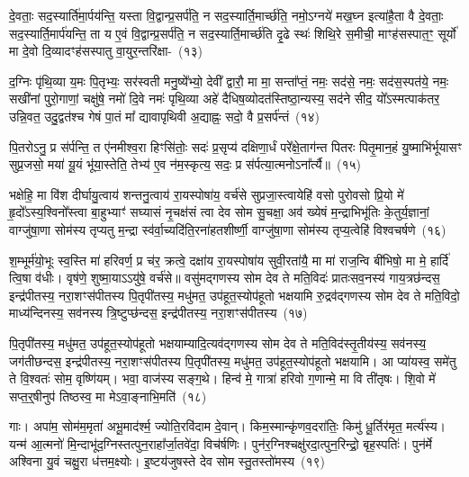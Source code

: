 दे॒वताः॒ सद॒स्यार्ति॑मा॒र्पय॑न्ति॒ यस्ता वि॒द्वान्प्र॒सर्प॑ति॒ न सद॒स्यार्ति॒मार्च्छ॑ति॒ नमो॒\-ऽग्नये॑ मख॒घ्न इत्या॑है॒ता वै दे॒वताः॒ सद॒स्यार्ति॒मार्प॑यन्ति॒ ता य ए॒वं वि॒द्वान्प्र॒सर्प॑ति॒ न सद॒स्यार्ति॒मार्च्छ॑ति दृ॒ढे स्थः॑ शिथि॒रे स॒मीची॒ माꣳह॑सस्पात॒ꣳ॒ सूर्यो॑ मा दे॒वो दि॒व्यादꣳह॑सस्पातु वा॒युर॒न्तरि॑क्षा-~(१३)

द॒ग्निः पृ॑थि॒व्या य॒मः पि॒तृभ्यः॒ सर॑स्वती मनु॒ष्ये᳚भ्यो॒ देवी᳚ द्वारौ॒ मा मा॒ सन्ता᳚प्तं॒ नमः॒ सद॑से॒ नमः॒ सद॑स॒स्पत॑ये॒ नमः॒ सखी॑नां पुरो॒गाणां॒ चक्षु॑षे॒ नमो॑ दि॒वे नमः॑ पृथि॒व्या अहे॑ दैधिष॒व्योदत॑स्तिष्ठा॒न्यस्य॒ सद॑ने सीद॒ यो᳚\-ऽस्मत्पाक॑तर॒ उन्नि॒वत॒ उदु॒द्वत॑श्च गेषं पा॒तं मा᳚ द्यावा\-पृथिवी अ॒द्याह्नः॒ सदो॒ वै प्र॒सर्प॑न्तं~(१४)

पि॒तरो\-ऽनु॒ प्र स॑र्पन्ति॒ त ए॑नमीश्व॒रा हिꣳसि॑तोः॒ सदः॑ प्र॒सृप्य॑ दक्षिणा॒र्धं परे᳚क्षे॒ताग॑न्त पितरः पितृ॒मान॒हं यु॒ष्माभि॑र्भूयासꣳ सुप्र॒जसो॒ मया॑ यू॒यं भू॑या॒स्तेति॒ तेभ्य॑ ए॒व न॑म॒स्कृत्य॒ सदः॒ प्र स॑र्पत्या॒त्मनो\-ऽना᳚र्त्यै॥~(१५)

{\anuvakamend[{म॒खो वा अ॒न्तरि॑क्षात्प्र॒सर्प॑न्त॒न्त्रय॑स्त्रिꣳशच्च}]}%

भक्षेहि॒ मा वि॑श दीर्घायु॒त्वाय॑ शन्तनु॒त्वाय॑ रा॒यस्पोषा॑य॒ वर्च॑से सुप्रजा॒स्त्वायेहि॑ वसो पुरोवसो प्रि॒यो मे॑ हृ॒दो᳚\-ऽस्य॒श्विनो᳚स्त्वा बा॒हुभ्याꣳ॑ सघ्यासं नृ॒चक्ष॑सं त्वा देव सोम सु॒चक्षा॒ अव॑ ख्येषं म॒न्द्राभिभू॑तिः के॒तुर्य॒ज्ञानां॒ वाग्जु॑षा॒णा सोम॑स्य तृप्यतु म॒न्द्रा स्व॑र्वा॒च्यदि॑ति॒रना॑हतशीर्ष्णी॒ वाग्जु॑षा॒णा सोम॑स्य तृप्य॒त्वेहि॑ विश्वचर्\mbox{}षणे~(१६)

श॒म्भूर्म॑यो॒भूः स्व॒स्ति मा॑ हरिवर्ण॒ प्र च॑र॒ क्रत्वे॒ दक्षा॑य रा॒यस्पोषा॑य सुवी॒रता॑यै॒ मा मा॑ राज॒न्वि बी॑भिषो॒ मा मे॒ हार्दि॑ त्वि॒षा व॑धीः। वृष॑णे॒ शुष्मा॒या\-ऽऽ\-यु॑षे॒ वर्च॑से॥ वसु॑मद्गणस्य सोम देव ते मति॒विदः॑ प्रातःसव॒नस्य॑ गाय॒त्रछ॑न्दस॒ इन्द्र॑पीतस्य॒ नरा॒शꣳस॑पीतस्य पि॒तृपी॑तस्य॒ मधु॑मत॒ उप॑हूत॒स्योप॑हूतो भक्षयामि रु॒द्रव॑द्गणस्य सोम देव ते मति॒विदो॒ माध्य॑न्दिनस्य॒ सव॑नस्य त्रि॒ष्टुप्छ॑न्दस॒ इन्द्र॑पीतस्य॒ नरा॒शꣳस॑पीतस्य~(१७)

पि॒तृपी॑तस्य॒ मधु॑मत॒ उप॑हूत॒स्योप॑हूतो भक्षयाम्यादि॒त्यव॑द्गणस्य सोम देव ते मति॒विद॑स्तृ॒तीय॑स्य॒ सव॑नस्य॒ जग॑तीछन्दस॒ इन्द्र॑पीतस्य॒ नरा॒शꣳस॑पीतस्य पि॒तृपी॑तस्य॒ मधु॑मत॒ उप॑हूत॒स्योप॑हूतो भक्षयामि। आ प्या॑यस्व॒ समे॑तु ते वि॒श्वतः॑ सोम॒ वृष्णि॑यम्। भवा॒ वाज॑स्य सङ्ग॒थे। हिन्व॑ मे॒ गात्रा॑ हरिवो ग॒णान्मे॒ मा वि ती॑तृषः। शि॒वो मे॑ सप्त॒र्॒\mbox{}षीनुप॑ तिष्ठस्व॒ मा मे\-ऽवा॒ङ्नाभि॒मति॑~(१८)

गाः। अपा॑म॒ सोम॑म॒मृता॑ अभू॒माद॑र्श्म॒ ज्योति॒रवि॑दाम दे॒वान्। किम॒स्मान्कृ॑णव॒दरा॑तिः॒ किमु॑ धू॒र्तिर॑मृत॒ मर्त्य॑स्य। यन्म॑ आ॒त्मनो॑ मि॒न्दाभू॑द॒ग्निस्तत्पुन॒राहा᳚र्जा॒तवे॑दा॒ विच॑र्\mbox{}षणिः। पुन॑र॒ग्निश्चक्षु॑रदा॒त्पुन॒रिन्द्रो॒ बृह॒स्पतिः॑। पुन॑र्मे अश्विना यु॒वं चक्षु॒रा ध॑त्तम॒क्ष्योः। इ॒ष्टय॑जुषस्ते देव सोम स्तु॒तस्तो॑मस्य~(१९)

